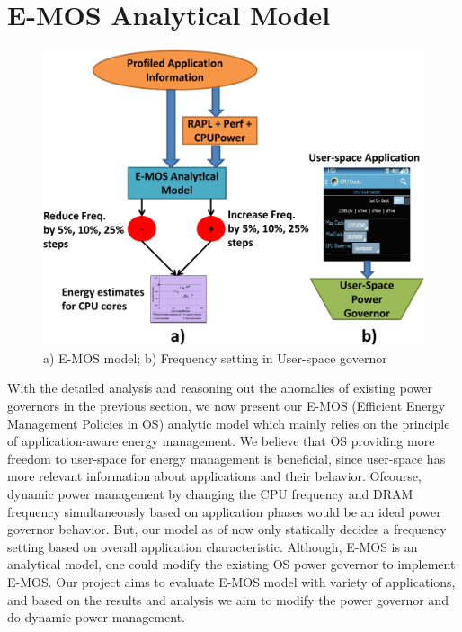\section{E-MOS Analytical Model}\label{sec:analytic}

\begin{figure}[h]
  \begin{center}
\includegraphics[width=\linewidth]{figs/EMOS-new-crop.pdf}
  \end{center}
  \vspace{-0.1in}
  \caption{a) E-MOS model; b) Frequency setting in User-space governor}
	\label{fig:emos-model}
\end{figure}


With the detailed analysis and reasoning out the anomalies 
of existing power governors in the previous section, we now present our 
E-MOS (Efficient Energy Management Policies in OS) analytic model
which mainly relies on the principle of application-aware energy management. 
We believe that OS providing more freedom to user-space for energy
management is beneficial, since user-space has more relevant information about applications
and their behavior. Ofcourse, dynamic power management by changing the CPU frequency and 
DRAM frequency simultaneously based on application phases would be an ideal 
power governor behavior. But, our model as of now only statically decides a frequency setting 
based on overall application characteristic. Although, E-MOS is an analytical model,
one could modify the existing OS power governor to implement E-MOS. Our project
aims to evaluate E-MOS model with variety of applications, and based on the results
and analysis we aim to modify the power governor and do dynamic power management.

